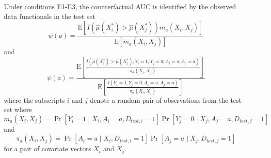 \begin{theorem}
    Under conditions E1-E3, the counterfactual AUC is identified by the observed data functionals in the test set
\begin{equation}\label{eqn:cl_auc_estimand}
    \psi(a) = \frac{\mathrm{E}\left[I\left(\widehat{\mu}(X_i^*)>\widehat{\mu}(X_j^*)\right)m_a(X_i, X_j) \right]}{\mathrm{E}\left[m_a(X_i, X_j) \right]} 
\end{equation}
and 
\begin{equation}\label{eqn:ipw_auc_estimand}
    \psi(a) = \frac{\mathrm{E}\left[\frac{I\left(\widehat{\mu}(X_i^*)>\widehat{\mu}(X_j^*), Y_i=1, Y_j=0, A_i = a, A_j = a\right)}{\pi_a(X_i, X_j)} \right]}{\mathrm{E}\left[\frac{I\left(Y_i=1, Y_j=0, A_i = a, A_j = a\right)}{\pi_a(X_i, X_j)}\right]} 
\end{equation}
where the subscripts $i$ and $j$ denote a random pair of observations from the test set where
\begin{equation*}
    m_a(X_i, X_j) = \operatorname{Pr}\left[Y_i=1 \mid X_i,A_i = a, D_{test,i} = 1\right] \Pr\left[ Y_j=0 \mid X_j, A_j = a, D_{test,j} = 1\right]
\end{equation*}
and 
\begin{equation*}
    \pi_a(X_i, X_j) = \Pr\left[A_i = a \mid X_i, D_{test,i} = 1\right] \Pr\left[A_j = a  \mid X_j, D_{test,j} = 1\right]
\end{equation*}
for a pair of covariate vectors $X_i$ and $X_j$. 
\end{theorem}

